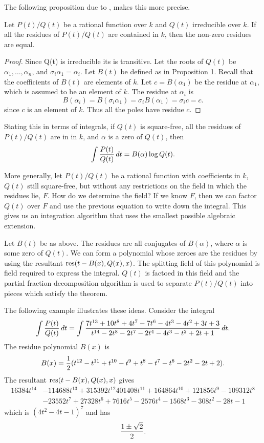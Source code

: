 The following proposition due to {\Trager} \cite{Trager76b}, makes this
more precise.

\begin{proposition}[Trager]
Let $P(t)/Q(t)$ be a rational function over $k$ and $Q(t)$ irreducible
over $k$.  If all the residues of $P(t)/Q(t)$ are contained in $k$,
then the non-zero residues are equal.
\end{proposition}

\begin{proof}
Since Q(t) is irreducible its  is transitive.  Let
the roots of $Q(t)$ be $\alpha_1, \ldots, \alpha_n$, and $\sigma_i
\alpha_1 = \alpha_i$.  Let $B(t)$ be defined as in Proposition 1.
Recall that the coefficients of $B(t)$ are elements of $k$.  Let $c =
B(\alpha_1)$ be the residue at $\alpha_1$, which is assumed to be an
element of $k$.  The residue at $\alpha_i$ is
\[
B(\alpha_i) = B(\sigma_i \alpha_1) = \sigma_iB(\alpha_1)= \sigma_i c = c.
\]
since $c$ is an element of $k$.  Thus all the poles have residue $c$. 
\end{proof}

Stating this in terms of integrals, if $Q(t)$ is square-free, all the
residues of $P(t)/Q(t)$ are in in $k$, and $\alpha$ is a zero of $Q(t)$,
then
\[
\int {P(t) \over Q(t)} \, dt = B(\alpha) \log Q(t).
\]

More generally, let $P(t)/Q(t)$ be a rational function with coefficients in
$k$, $Q(t)$ still square-free, but without any restrictions on the field
in which the residues lie, $F$.  How do we determine the field?  If we know
$F$, then we can factor $Q(t)$ over $F$ and use the previous equation to
write down the integral.  This gives us an integration algorithm that uses
the smallest possible algebraic extension.

Let $B(t)$ be as above.  The residues are all conjugates of $B(\alpha)$,
where $\alpha$ is some zero of $Q(t)$.  We can form a polynomial whose
zeroes are the residues by using the resultant
$\mathop{\rm res}\nolimits(t - B(x), Q(x), x)$.  The splitting field of this polynomial is field
required to express the integral.  $Q(t)$ is factoed in this field and
the partial fraction decomposition algorithm is used to  separate
$P(t)/Q(t)$ into pieces which satisfy the theorem.  

The following example illustrates these ideas.  Consider the integral
\[
\int {P(t) \over Q(t)} \, dt =
\int {7 t^{13} + 10t^8 +4 t^7 - 7t^6 - 4t^3 - 4t^2 + 3t +3 \over
t^{14} - 2t^8 - 2t^7 - 2t^4 - 4t^3 - t^2 + 2t +1} \, dt.
\]
The residue polynomial $B(x)$ is
\[
B(x) = {1 \over 2} (t^{12} - t^{11} + t^{10} - t^9 + t^8 - t^7 - t^6 -
2t^2 - 2t +2).
\]
The resultant $\mathop{\rm res}\nolimits(t - B(x), Q(x), x)$ gives
\[
\begin{aligned}
  16384 t^{14} &- 114688 t^{13} + 315392 t^{12}
      401408 t^{11} + 164864 t^{10} + 121856 t^9 - 109312 t^8 \\
    & -23552 t^7 +27328 t^6 + 7616 t^5 - 2576 t^4 - 1568 t^3
      -308 t^2 - 28 t -1 
\end{aligned}
\]
which is $(4 t^2 - 4t -1)^7$ and has 
\[
{1 \pm \sqrt{2} \over 2}.
\]

